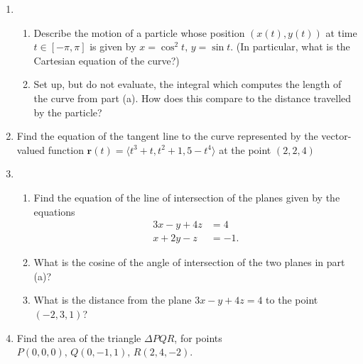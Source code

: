 \documentclass[12pt]{article}
\newcommand{\points}[1]{\marginpar{\hspace{24pt}[#1]}}
\begin{document}
\begin{enumerate}
\item \begin{enumerate}
\item Describe the motion of a particle whose position $(x(t),y(t))$ at time $t\in [-\pi,\pi]$ is given by $x=\cos^2 t,\, y=\sin t$. (In particular, what is the Cartesian equation of the curve?) \points{6}

\vspace{3in}

\item Set up, but do not evaluate, the integral which computes the length of the curve from part (a). How does this compare to the distance travelled by the particle? \points{4}

\vspace{2.5in}

\end{enumerate}
\item Find the equation of the tangent line to the curve represented by the vector-valued function $\mathbf{r}(t) = \langle t^3+t,t^2+1,5-t^4\rangle$ at the point $(2,2,4)$ \points{4}

\newpage

\item \begin{enumerate}
\item Find the equation of the line of intersection of the planes given by the equations \points{8}
\begin{align*}
3x - y + 4z & = 4\\
x + 2y - z & = -1.
\end{align*}


\vspace*{4in}

\item What is the cosine of the angle of intersection of the two planes in part (a)? \points{2}

\vspace{1.5in}

\item What is the distance from the plane $3x-y+4z=4$ to the point $(-2,3,1)$? \points{3}

\end{enumerate}

\newpage

\item Find the area of the triangle $\Delta PQR$, for points $P(0,0,0),\, Q(0,-1,1),\, R(2,4,-2)$. \points{7}


\end{enumerate}
\end{document}
